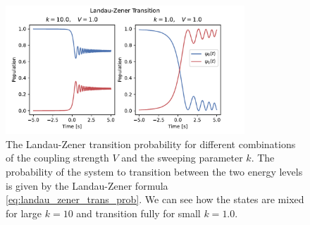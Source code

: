 \documentclass{subfiles}
\begin{document}
\begin{figure}[h!]
    \centering
    \includegraphics[width=0.8\textwidth]{figs/landau_zener.pdf}
    \caption{The Landau-Zener transition probability for different combinations of the coupling strength $V$ and the sweeping parameter $k$. The probability of the system to transition between the two energy levels is given by the Landau-Zener formula \eqref{eq:landau_zener_trans_prob}. We can see how the states are mixed for large $k=10$ and transition fully for small $k=1.0$.}
    \label{fig:landau_zener}
\end{figure} 
\end{document}
